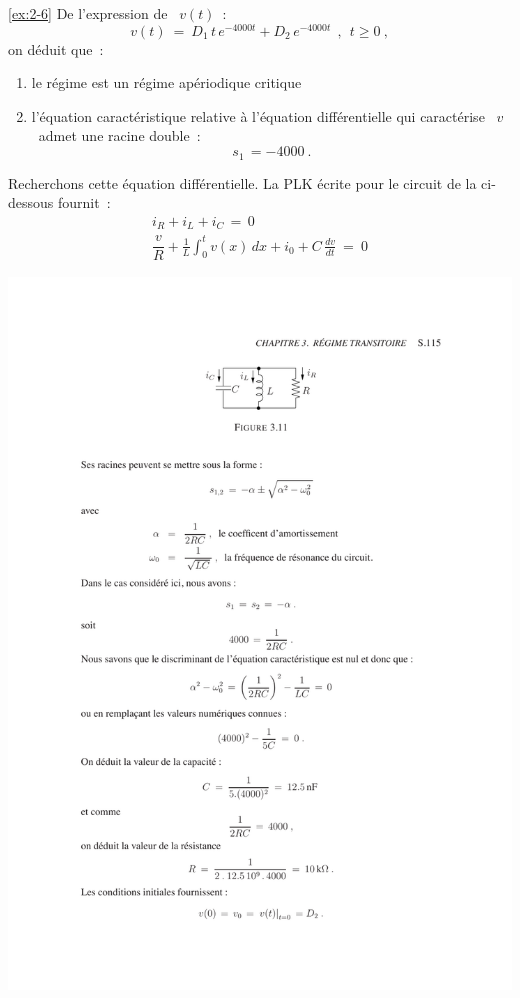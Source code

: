 \begin{solexercise}{\ref{ex:2-6}}
	\label{solex:2-6}
De l'expression de \ $v(t)$~:
\[ v(t) \: = \: D_1\, t\, e^{-4000t} + D_2\, e^{-4000t}~~, ~~t\geq 0~, \]
on d\'eduit que~:
\begin{enumerate}
	\item le r\'egime est un r\'egime ap\'eriodique critique
	\item l'\'equation caract\'eristique relative \`a l'\'equation diff\'erentielle
	qui caract\'erise \ $v$ \ admet une racine double~:
	\[ s_1 \, = -4000~. \]
\end{enumerate}
Recherchons cette \'equation diff\'erentielle.
La PLK \'ecrite pour le circuit de la ci-dessous fournit~:
\[ \begin{array}{c}
i_R + i_L + i_C \, = \, 0\\[3mm]
\dfrac{v}{R} + {\displaystyle \frac{1}{L}} {\displaystyle \int^t_0} v(x) \, dx 
+ i_0 + C\, {\displaystyle \frac{dv}{dt}} \: = \: 0\end{array} \]
\begin{center}
	\includegraphics[width=\linewidth]{sol_exercices/ex3-6}
\end{center}


\end{solexercise}
